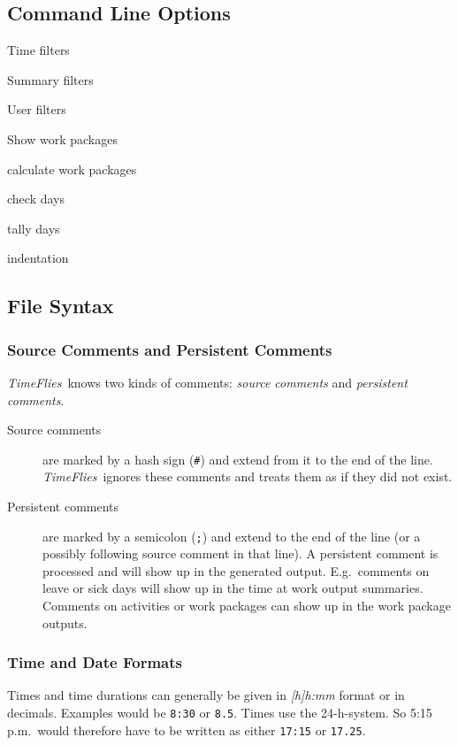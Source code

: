 \documentclass[11pt]{article}
\newcommand{\timeflies}{\emph{TimeFlies}}
\begin{document}
\subsection{Command Line Options}

Time filters

Summary filters

User filters

Show work packages

calculate work packages

check days

tally days

indentation

\subsection{File Syntax}

\subsubsection{Source Comments and Persistent Comments}

\timeflies\ knows two kinds of comments: \emph{source comments} and \emph{persistent comments}.

\begin{description}
\item[Source comments] are marked by a hash sign (\verb:#:) and extend from it to the end of the line. \timeflies\ ignores these comments and treats them as if they did not exist.

\item[Persistent comments] are marked by a semicolon (\verb:;:) and extend to the end of the line (or a possibly following source comment in that line). A persistent comment is processed and will show up in the generated output. E.g.\ comments on leave or sick days will show up in the time at work output summaries. Comments on activities or work packages can show up in the work package outputs. 
\end{description}

\subsubsection{Time and Date Formats}

Times and time durations can generally be given in \emph{[h]h:mm} format or in decimals. Examples would be \verb-8:30- or \verb-8.5-. Times use the 24-h-system. So 5:15 p.m.\ would therefore have to be written as either \verb-17:15- or \verb-17.25-.
\end{document}
